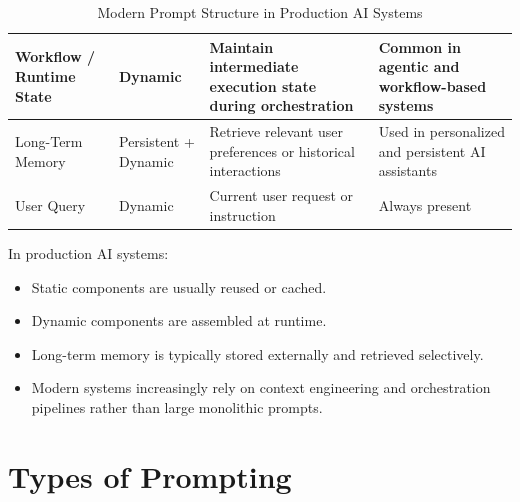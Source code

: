 \documentclass[10pt,a4paper]{article}
\begin{document}
\begin{table}[h]
\begin{tabular}{|p{4cm}|p{2.5cm}|p{4.5cm}|p{3.5cm}|}
\hline

Workflow / Runtime State &
Dynamic &
Maintain intermediate execution state during orchestration &
Common in agentic and workflow-based systems \\

\hline

Long-Term Memory &
Persistent + Dynamic &
Retrieve relevant user preferences or historical interactions &
Used in personalized and persistent AI assistants \\

\hline

User Query &
Dynamic &
Current user request or instruction &
Always present \\

\hline

\end{tabular}

\caption{Modern Prompt Structure in Production AI Systems}
\label{tab:modern-prompt-structure}

\end{table}




In production AI systems:
\begin{itemize}
\item Static components are usually reused or cached.
\item Dynamic components are assembled at runtime.
\item Long-term memory is typically stored externally and retrieved selectively.
\item Modern systems increasingly rely on context engineering and orchestration pipelines rather than large monolithic prompts.
\end{itemize}


\section{Types of Prompting}
\end{document}
